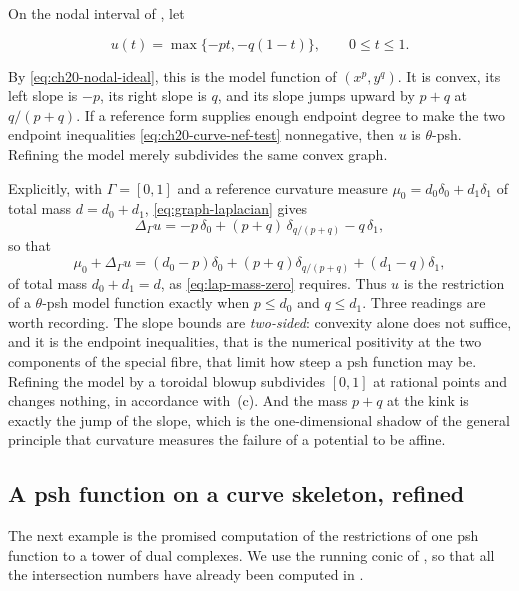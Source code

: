 \begin{example}
\label{ex:ch21-kink-example}
On the nodal interval of , let

\begin{equation}
\label{eq:ch21-kink}
                  u(t)=\max\{-pt,-q(1-t)\},
                  \qquad 0\leq t\leq1.
\end{equation}

By \eqref{eq:ch20-nodal-ideal}, this is the model function of
$(x^p,y^q)$.  It is convex, its left slope is $-p$, its right slope is
$q$, and its slope jumps upward by $p+q$ at $q/(p+q)$.  If a reference
form supplies enough endpoint degree to make the two endpoint inequalities
\eqref{eq:ch20-curve-nef-test} nonnegative, then $u$ is
$\theta$-psh.  Refining the model merely subdivides the same convex graph.

Explicitly, with $\Gamma=[0,1]$ and a reference curvature measure
$\mu_0=d_0\delta_0+d_1\delta_1$ of total mass $d=d_0+d_1$,
\eqref{eq:graph-laplacian} gives
\[
 \Delta_\Gamma u
 =-p\,\delta_0+(p+q)\,\delta_{q/(p+q)}-q\,\delta_1 ,
\]
so that
\[
 \mu_0+\Delta_\Gamma u
 =(d_0-p)\delta_0+(p+q)\delta_{q/(p+q)}+(d_1-q)\delta_1 ,
\]
of total mass $d_0+d_1=d$, as \eqref{eq:lap-mass-zero} requires.  Thus
$u$ is the restriction of a $\theta$-psh model function exactly when
$p\leq d_0$ and $q\leq d_1$.  Three readings are worth recording.  The
slope bounds are \emph{two-sided}: convexity alone does not suffice, and it
is the endpoint inequalities, that is the numerical positivity at the two
components of the special fibre, that limit how steep a psh function may be.
Refining the model by a toroidal blowup subdivides $[0,1]$ at rational
points and changes nothing, in accordance with
\,(c).  And the mass $p+q$ at the kink is
exactly the jump of the slope, which is the one-dimensional shadow of the
general principle that curvature measures the failure of a potential to be
affine.
\end{example}

\subsection{A psh function on a curve skeleton, refined}
\label{sec:ch21-worked-conic}

The next example is the promised computation of the restrictions of one psh
function to a tower of dual complexes.  We use the running conic of
, so that all the intersection numbers have
already been computed in .

